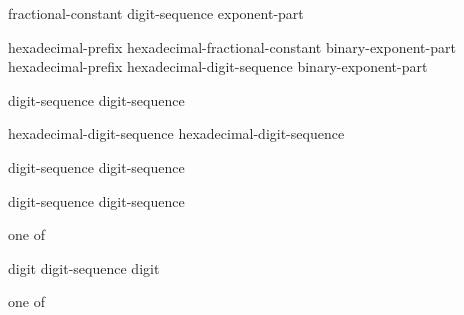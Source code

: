 \documentclass{wg21}
\begin{document}
\begin{bnf}
    \br
    fractional-constant  \br
    digit-sequence exponent-part 
\end{bnf}

\begin{bnf}
    \br
    hexadecimal-prefix hexadecimal-fractional-constant binary-exponent-part \br
    hexadecimal-prefix hexadecimal-digit-sequence binary-exponent-part 
\end{bnf}

\begin{bnf}
    \br
      digit-sequence\br
    digit-sequence 
\end{bnf}

\begin{bnf}
    \br
      hexadecimal-digit-sequence\br
    hexadecimal-digit-sequence 
\end{bnf}

\begin{bnf}
    \br
      digit-sequence\br
      digit-sequence
\end{bnf}

\begin{bnf}
    \br
      digit-sequence\br
      digit-sequence
\end{bnf}

\begin{bnf}
     \textnormal{one of}\br
    \terminal{+  -}
\end{bnf}

\begin{bnf}
    \br
    digit\br
    digit-sequence  digit
\end{bnf}

\begin{bnf}
     \textnormal{one of}\br
\end{bnf}
\end{document}
